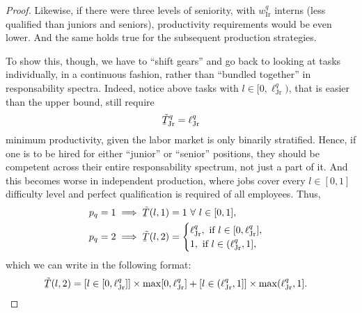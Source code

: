 \documentclass[hidelinks, nonatbib]{elsarticle}
\begin{document}
\begin{lemma}
\begin{proof}
        Likewise, if there were three levels of seniority, with $w_{\text{Ir}}^{q}$ interns (less qualified than juniors and seniors), productivity requirements would be even lower. And the same holds true for the subsequent production strategies.
        
        To show this, though, we have to ``shift gears'' and go back to looking at tasks individually, in a continuous fashion, rather than ``bundled together'' in responsability spectra. Indeed, notice above tasks with $l \in [0, \ell_{\text{Jr}}^{q})$, that is easier than the upper bound, still require
        \begin{gather}
            \underaccent{\bar}{\tilde{T}}_{\text{Jr}}^{q}
            =
            \ell_{\text{Jr}}^{q}
        \end{gather}
        minimum productivity, given the labor market is only binarily stratified. Hence, if one is to be hired for either ``junior'' or ``senior'' positions, they should be competent across their entire responsability spectrum, not just a part of it. And this becomes worse in independent production, where jobs cover every $l \in [0,1]$ difficulty level and perfect qualification is required of all employees. Thus, 
        \begin{align}
            p_q = 1
            &\implies
            \underaccent{\bar}{\tilde{T}}(l, 1)
            = 1
            \
            \forall
            \
            l \in [0,1]
            ,
            \\
            p_q = 2
            &\implies
            \underaccent{\bar}{\tilde{T}}(l, 2)
            = 
            \begin{cases}
                \ell_{\text{Jr}}^{q}, \text{ if } l \in [0, \ell_{\text{Jr}}^{q}],
                \\
                1, \text{ if } l \in (\ell_{\text{Jr}}^{q}, 1],
            \end{cases}
        \end{align}
        which we can write in the following format:
        \begin{align}
            \underaccent{\bar}{\tilde{T}}(l, 2)
            &= 
            [l \in [0, \ell_{\text{Jr}}^{q}]]
            \times
            \max[0, \ell_{\text{Jr}}^{q}]
            +
            [l \in (\ell_{\text{Jr}}^{q}, 1]]
            \times
            \max(\ell_{\text{Jr}}^{q}, 1]
            .
        \end{align}


\end{proof}
\end{lemma}
\end{document}
